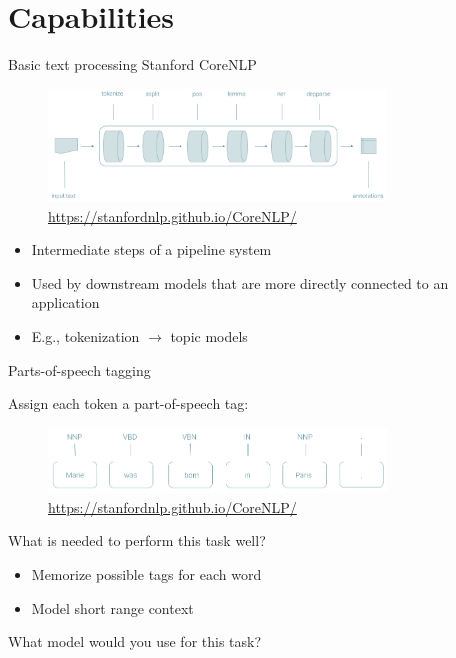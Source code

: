 \documentclass[usenames,dvipsnames,notes,11pt,aspectratio=169,hyperref={colorlinks=true, linkcolor=blue}]{beamer}
\newcommand{\pdfnote}[1]{}
\begin{document}
\section{Capabilities}

\begin{frame}
    {Basic text processing}
    Stanford CoreNLP\vspace{-0cm}
    \begin{figure}
        \includegraphics[height=3cm]{figures/pipeline}
        \caption{\url{https://stanfordnlp.github.io/CoreNLP/}}
    \end{figure}\vspace{-0cm}

    \begin{itemize}
        \item Intermediate steps of a pipeline system
        \item Used by downstream models that are more directly connected to an application 
        \item E.g., tokenization $\longrightarrow$ topic models
    \end{itemize}
\end{frame}

\begin{frame}
    {Parts-of-speech tagging}

    Assign each token a part-of-speech tag:
    \begin{figure}
        \includegraphics[width=0.8\textwidth]{figures/pos}
        \caption{\url{https://stanfordnlp.github.io/CoreNLP/}}
    \end{figure}

    What is needed to perform this task well?\\\pause
    \begin{itemize}
        \item Memorize possible tags for each word
        \item Model short range context
    \end{itemize}

    What model would you use for this task?
    \pdfnote{
        Bidirectional LSTM, Transformer
    }
\end{frame}
\end{document}
